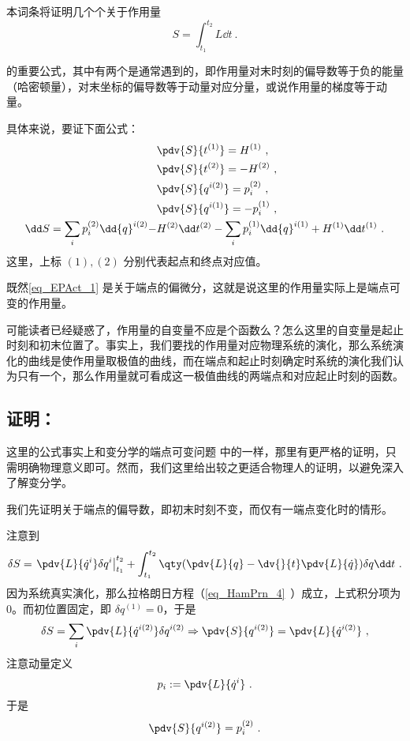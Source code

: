 
本词条将证明几个个关于作用量
\begin{equation}
S=\int_{t_1}^{t_2}L\dd t~.
\end{equation}

的重要公式，其中有两个是通常遇到的，即作用量对末时刻的偏导数等于负的能量（哈密顿量），对末坐标的偏导数等于动量对应分量，或说作用量的梯度等于动量。

具体来说，要证下面公式：
\begin{equation}\label{eq_EPAct_1}
\begin{aligned}
&\pdv{S}{t^{(1)}}=H^{(1)}~,\\
&\pdv{S}{t^{(2)}}=-H^{(2)}~,\\
&\pdv{S}{{q}^{i(2)}}=p_i^{(2)}~,\\
&\pdv{S}{{q}^{i (1)}}=-p_i^{(1)}~,\\
\dd S=\sum_i p_i^{(2)}\dd {q}^{i (2)}-&H^{(2)}\dd t^{(2)}-\sum_i p_i^{(1)}\dd {q}^{i (1)}+H^{(1)}\dd t^{(1)}~.
\end{aligned}
\end{equation}
这里，上标 $(1),(2)$ 分别代表起点和终点对应值。

既然\autoref{eq_EPAct_1} 是关于端点的偏微分，这就是说这里的作用量实际上是端点可变的作用量。

可能读者已经疑惑了，作用量的自变量不应是个函数么？怎么这里的自变量是起止时刻和初末位置了。事实上，我们要找的作用量对应物理系统的演化，那么系统演化的曲线是使作用量取极值的曲线，而在端点和起止时刻确定时系统的演化我们认为只有一个，那么作用量就可看成这一极值曲线的两端点和对应起止时刻的函数。
\subsection{证明：}
这里的公式事实上和变分学的端点可变问题 中的一样，那里有更严格的证明，只需明确物理意义即可。然而，我们这里给出较之更适合物理人的证明，以避免深入了解变分学。

我们先证明关于端点的偏导数，即初末时刻不变，而仅有一端点变化时的情形。

注意到
\begin{equation}
\delta S=\left.\pdv{L}{\dot q^i}\delta q^i\right|_{t_1}^{t_2}+\int_{t_1}^{t_2}\qty(\pdv{L}{q}-\dv{}{t}\pdv{L}{\dot q})\delta q\dd t~.
\end{equation}
因为系统真实演化，那么拉格朗日方程（\autoref{eq_HamPrn_4}~）成立，上式积分项为0。而初位置固定，即 $\delta q^{(1)}=0$，于是
\begin{equation}
\delta S=\sum_i\pdv{L}{{\dot q}^{i (2)}}\delta {q}^{i (2)}\Rightarrow \pdv{S}{{q}^{i (2)}}=\pdv{L}{{\dot q}^{i (2)}}~,
\end{equation}
注意动量定义
\begin{equation}
p_i:=\pdv{L}{\dot q^i}~.
\end{equation}
于是
\begin{equation}
\pdv{S}{{q}^{i (2)}}=p_i^{(2)}~.
\end{equation}

